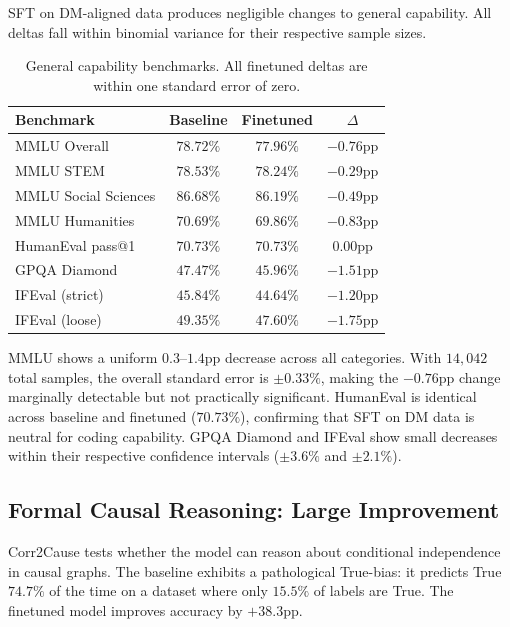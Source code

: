 \documentclass{article}
\begin{document}
SFT on DM-aligned data produces negligible changes to general capability. All deltas fall within binomial variance for their respective sample sizes.

\begin{table}[t]
\caption{General capability benchmarks. All finetuned deltas are within one standard error of zero.}
\label{tab:general}
\begin{center}
\begin{tabular}{lccc}
\toprule
Benchmark & Baseline & Finetuned & $\Delta$ \\
\midrule
MMLU Overall & $78.72\%$ & $77.96\%$ & $-0.76$pp \\
MMLU STEM & $78.53\%$ & $78.24\%$ & $-0.29$pp \\
MMLU Social Sciences & $86.68\%$ & $86.19\%$ & $-0.49$pp \\
MMLU Humanities & $70.69\%$ & $69.86\%$ & $-0.83$pp \\
HumanEval pass@1 & $70.73\%$ & $70.73\%$ & $0.00$pp \\
GPQA Diamond & $47.47\%$ & $45.96\%$ & $-1.51$pp \\
IFEval (strict) & $45.84\%$ & $44.64\%$ & $-1.20$pp \\
IFEval (loose) & $49.35\%$ & $47.60\%$ & $-1.75$pp \\
\bottomrule
\end{tabular}
\end{center}
\end{table}

MMLU shows a uniform $0.3$--$1.4$pp decrease across all categories. With $14{,}042$ total samples, the overall standard error is $\pm0.33\%$, making the $-0.76$pp change marginally detectable but not practically significant. HumanEval is identical across baseline and finetuned ($70.73\%$), confirming that SFT on DM data is neutral for coding capability. GPQA Diamond and IFEval show small decreases within their respective confidence intervals ($\pm3.6\%$ and $\pm2.1\%$).

\subsection{Formal Causal Reasoning: Large Improvement}

Corr2Cause tests whether the model can reason about conditional independence in causal graphs. The baseline exhibits a pathological True-bias: it predicts True $74.7\%$ of the time on a dataset where only $15.5\%$ of labels are True. The finetuned model improves accuracy by $+38.3$pp.
\end{document}
